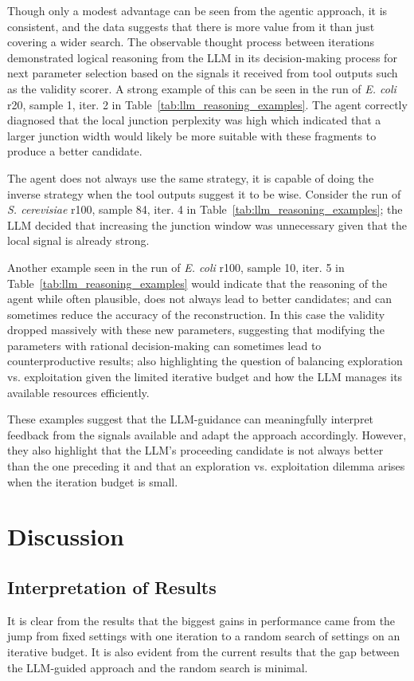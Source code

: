 \documentclass[journal]{IEEEtran}
\newcommand{\floatflush}{}
\begin{document}
Though only a modest advantage can be seen from the agentic approach, it is consistent, and the
data suggests that there is more value from it than just covering a wider search.
The observable thought process between iterations demonstrated logical reasoning from the LLM
in its decision-making process for next parameter selection based on the signals it received from tool outputs such as the validity scorer.
A strong example of this can be seen in the run of \textit{E. coli} r20, sample 1, iter. 2 in Table~\ref{tab:llm_reasoning_examples}.
The agent correctly diagnosed that the local junction perplexity was high which indicated that a larger junction width would likely be more
suitable with these fragments to produce a better candidate.

The agent does not always use the same strategy, it is capable of doing the inverse strategy when
the tool outputs suggest it to be wise. Consider the run of \textit{S. cerevisiae} r100, sample 84, iter. 4 in Table~\ref{tab:llm_reasoning_examples};
the LLM decided that increasing the junction window was unnecessary given that the local signal is already strong.

Another example seen in the run of \textit{E. coli} r100, sample 10, iter. 5 in Table~\ref{tab:llm_reasoning_examples} would indicate that the reasoning of the agent while often plausible,
does not always lead to better candidates; and can sometimes reduce the accuracy of the reconstruction. In this case the validity dropped
massively with these new parameters, suggesting that modifying the parameters with rational decision-making can sometimes lead to counterproductive results;
also highlighting the question of balancing exploration vs. exploitation given the limited iterative budget and how the LLM manages its available resources
efficiently.

These examples suggest that the LLM-guidance can meaningfully interpret
feedback from the signals available and adapt the approach accordingly. However, they also highlight that the
LLM's proceeding candidate is not always better than the one preceding it and that an exploration vs. exploitation
dilemma arises when the iteration budget is small.



\floatflush

\section{Discussion}
\subsection{Interpretation of Results}
It is clear from the results that the biggest gains in performance came from the jump from
fixed settings with one iteration to a random search of settings on an iterative budget.
It is also evident from the current results that the gap between the LLM-guided approach and
the random search is minimal.
\end{document}
